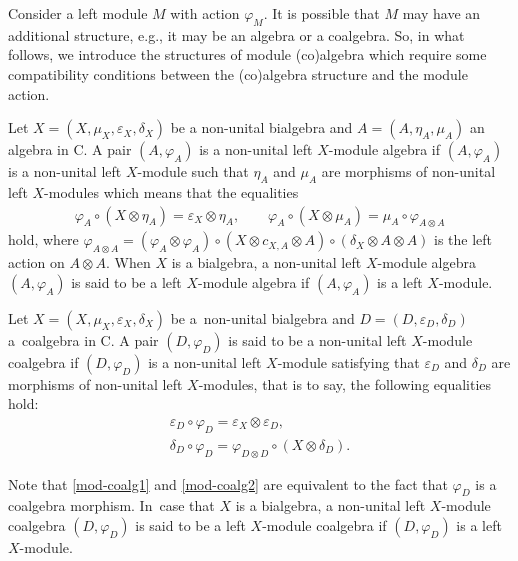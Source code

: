 \documentclass[pdftex]{sigma}
\numberwithin{equation}{section}
\begin{document}
Consider a left module $M$ with action $\varphi_{M}$. It is possible that $M$ may have an additional structure, e.g., it may be an algebra or a coalgebra. So, in what follows, we introduce the structures of module (co)algebra which require some compatibility conditions between the (co)algebra structure and the module action.
\begin{Definition}
Let $X=(X,\mu_{X},\varepsilon_{X},\delta_{X})$ be a non-unital bialgebra and $A=(A,\eta_{A},\mu_{A})$ an algebra in {\sf C}. A pair $(A,\varphi_{A})$ is a non-unital left $X$-module algebra if $(A,\varphi_{A})$ is a non-unital left $X$-module such that $\eta_{A}$ and $\mu_{A}$ are morphisms of non-unital left $X$-modules which means that the equalities
\begin{gather*}
\varphi_{A}\circ (X\otimes \eta_{A})=\varepsilon_{X}\otimes \eta_{A},\qquad
\varphi_{A}\circ (X\otimes \mu_{A})=\mu_{A}\circ \varphi_{A\otimes A}
\end{gather*}
hold, where $\varphi_{A\otimes A}=(\varphi_{A}\otimes \varphi_{A})\circ (X\otimes c_{X,A}\otimes A)\circ (\delta_{X}\otimes A\otimes A)$ is the left action on $A\otimes A$. When $X$ is a bialgebra, a non-unital left $X$-module algebra $(A,\varphi_{A})$ is said to be a left $X$-module algebra if $(A,\varphi_{A})$ is a left $X$-module.
\end{Definition}
\begin{Definition}
Let $X=(X,\mu_{X},\varepsilon_{X},\delta_{X})$ be a~non-unital bialgebra and $D=(D,\varepsilon_{D},\delta_{D})$ a~coalgebra in {\sf C}. A pair $(D,\varphi_{D})$ is said to be a non-unital left $X$-module coalgebra if $(D,\varphi_{D})$ is a non-unital left $X$-module satisfying that $\varepsilon_{D}$ and $\delta_{D}$ are morphisms of non-unital left $X$-modules, that is to say, the following equalities hold:
\begin{gather}\label{mod-coalg1}
\varepsilon_{D}\circ\varphi_{D}=\varepsilon_{X}\otimes\varepsilon_{D},\\\label{mod-coalg2}\delta_{D}\circ\varphi_{D}=\varphi_{D\otimes D}\circ(X\otimes\delta_{D}).
\end{gather}

Note that \eqref{mod-coalg1} and \eqref{mod-coalg2} are equivalent to the fact that $\varphi_{D}$ is a coalgebra morphism. In~case that $X$ is a bialgebra, a non-unital left $X$-module coalgebra $(D,\varphi_{D})$ is said to be a left $X$-module coalgebra if $(D,\varphi_{D})$ is a left $X$-module.
\end{Definition}
\end{document}
